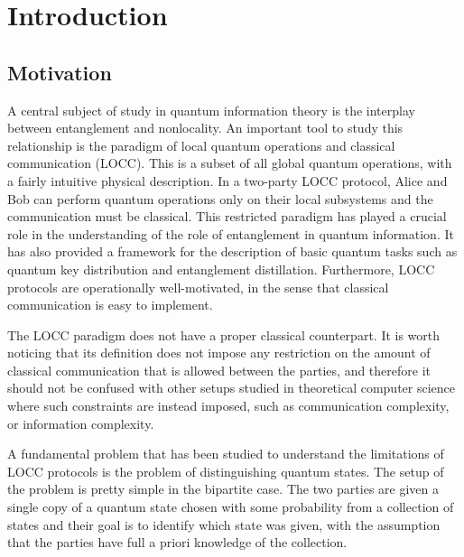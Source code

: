 \chapter{Introduction}
\label{chap:introduction}


\section{Motivation}

A central subject of study in quantum information theory is 
the interplay between entanglement and nonlocality.
An important tool to study this relationship is the paradigm
of local quantum operations and classical communication (LOCC). 
This is a subset of all global quantum operations, 
with a fairly intuitive physical description. 
In a two-party LOCC protocol, 
Alice and Bob can perform quantum operations only on their local
subsystems and the communication must be classical.
This restricted paradigm has played a crucial role in the understanding 
of the role of entanglement in quantum information. It has also provided a 
framework for the description of basic quantum tasks such as quantum key 
distribution and entanglement distillation.
Furthermore, LOCC protocols are operationally well-motivated, in the sense
that classical communication is easy to implement.

The LOCC paradigm does not have a proper classical counterpart.
It is worth noticing that its definition does not impose any restriction on the amount of 
classical communication that is allowed between the parties, and therefore it should not be
confused with other setups studied in theoretical computer science where such 
constraints are instead imposed, such as communication complexity, or information complexity.  

A fundamental problem that has been studied to understand the limitations of 
LOCC protocols is the problem of distinguishing quantum states.
The setup of the problem is pretty simple in the bipartite case.
The two parties are given a single copy of a quantum state chosen
with some probability from a collection of states and their goal is to identify 
which state was given, with the assumption that the parties have full 
a priori knowledge of the collection.

